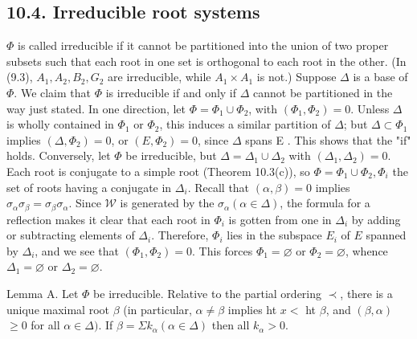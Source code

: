 \documentclass[10pt]{article}
\begin{document}
\subsection*{10.4. Irreducible root systems}
$\Phi$ is called irreducible if it cannot be partitioned into the union of two proper subsets such that each root in one set is orthogonal to each root in the other. (In (9.3), $A_{1}, A_{2}, B_{2}, G_{2}$ are irreducible, while $A_{1} \times A_{1}$ is not.) Suppose $\Delta$ is a base of $\Phi$. We claim that $\Phi$ is irreducible if and only if $\Delta$ cannot be partitioned in the way just stated. In one direction, let $\Phi=\Phi_{1} \cup \Phi_{2}$, with $\left(\Phi_{1}, \Phi_{2}\right)=0$. Unless $\Delta$ is wholly contained in $\Phi_{1}$ or $\Phi_{2}$, this induces a similar partition of $\Delta$; but $\Delta \subset \Phi_{1}$ implies $\left(\Delta, \Phi_{2}\right)=0$, or $\left(E, \Phi_{2}\right)=0$, since $\Delta$ spans E . This shows that the "if" holds. Conversely, let $\Phi$ be irreducible, but $\Delta=\Delta_{1} \cup \Delta_{2}$ with $\left(\Delta_{1}, \Delta_{2}\right)=0$. Each root is conjugate to a simple root (Theorem 10.3(c)), so $\Phi=\Phi_{1} \cup \Phi_{2}, \Phi_{i}$ the set of roots having a conjugate in $\Delta_{i}$. Recall that $(\alpha, \beta)=0$ implies $\sigma_{\alpha} \sigma_{\beta}=\sigma_{\beta} \sigma_{\alpha}$. Since $\mathscr{W}$ is generated by the $\sigma_{\alpha}(\alpha \in \Delta)$, the formula for a reflection makes it clear that each root in $\Phi_{i}$ is gotten from one in $\Delta_{i}$ by adding or subtracting elements of $\Delta_{i}$. Therefore, $\Phi_{i}$ lies in the subspace $E_{i}$ of $E$ spanned by $\Delta_{i}$, and we see that $\left(\Phi_{1}, \Phi_{2}\right)=0$. This forces $\Phi_{1}=\varnothing$ or $\Phi_{2}=\varnothing$, whence $\Delta_{1}=\varnothing$ or $\Delta_{2}=\varnothing$.

Lemma A. Let $\Phi$ be irreducible. Relative to the partial ordering $\prec$, there is a unique maximal root $\beta$ (in particular, $\alpha \neq \beta$ implies ht $x<$ ht $\beta$, and $(\beta, \alpha)$ $\geq 0$ for all $\alpha \in \Delta)$. If $\beta=\Sigma k_{\alpha}(\alpha \in \Delta)$ then all $k_{\alpha}>0$.
\end{document}
